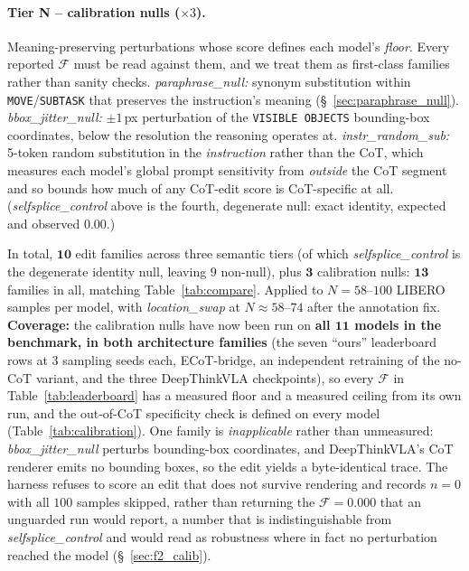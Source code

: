 \documentclass{article}
\begin{document}
\paragraph{Tier N -- calibration nulls ($\times 3$).} Meaning-preserving perturbations whose score defines each model's \emph{floor}. Every reported $\mathcal{F}$ must be read against them, and we treat them as first-class families rather than sanity checks. \emph{paraphrase\_null:} synonym substitution within \texttt{MOVE}/\texttt{SUBTASK} that preserves the instruction's meaning (\S~\ref{sec:paraphrase_null}). \emph{bbox\_jitter\_null:} $\pm 1$\,px perturbation of the \texttt{VISIBLE OBJECTS} bounding-box coordinates, below the resolution the reasoning operates at. \emph{instr\_random\_sub:} 5-token random substitution in the \emph{instruction} rather than the CoT, which measures each model's global prompt sensitivity from \emph{outside} the CoT segment and so bounds how much of any CoT-edit score is CoT-specific at all. (\emph{selfsplice\_control} above is the fourth, degenerate null: exact identity, expected and observed $0.00$.)

In total, $\mathbf{10}$ edit families across three semantic tiers (of which \emph{selfsplice\_control} is the degenerate identity null, leaving $9$ non-null), plus $\mathbf{3}$ calibration nulls: $\mathbf{13}$ families in all, matching Table~\ref{tab:compare}. Applied to $N{=}58$--$100$ LIBERO samples per model, with \emph{location\_swap} at $N\!\approx\!58$--$74$ after the annotation fix. \textbf{Coverage:} the calibration nulls have now been run on \textbf{all $\mathbf{11}$ models in the benchmark, in both architecture families} (the seven ``ours'' leaderboard rows at 3 sampling seeds each, ECoT-bridge, an independent retraining of the no-CoT variant, and the three DeepThinkVLA checkpoints), so every $\mathcal{F}$ in Table~\ref{tab:leaderboard} has a measured floor and a measured ceiling from its own run, and the out-of-CoT specificity check is defined on every model (Table~\ref{tab:calibration}). One family is \emph{inapplicable} rather than unmeasured: \emph{bbox\_jitter\_null} perturbs bounding-box coordinates, and DeepThinkVLA's CoT renderer emits no bounding boxes, so the edit yields a byte-identical trace. The harness refuses to score an edit that does not survive rendering and records $n{=}0$ with all $100$ samples skipped, rather than returning the $\mathcal{F}=0.000$ that an unguarded run would report, a number that is indistinguishable from \emph{selfsplice\_control} and would read as robustness where in fact no perturbation reached the model (\S~\ref{sec:f2_calib}).
\end{document}
